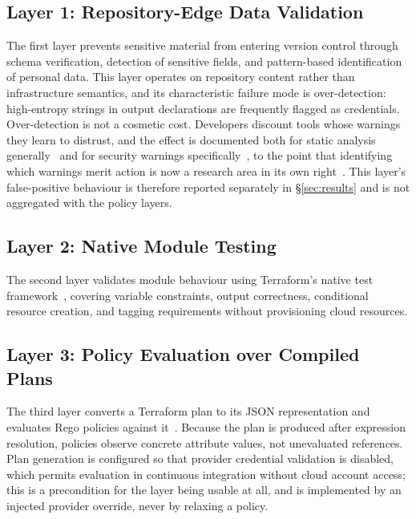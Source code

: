 \documentclass[journal]{IEEEtran}
\begin{document}
\subsection{Layer 1: Repository-Edge Data Validation}
The first layer prevents sensitive material from entering version control through
schema verification, detection of sensitive fields, and pattern-based
identification of personal data. This layer operates on repository content rather
than infrastructure semantics, and its characteristic failure mode is
over-detection: high-entropy strings in output declarations are frequently
flagged as credentials. Over-detection is not a cosmetic cost. Developers
discount tools whose warnings they learn to distrust, and the effect is
documented both for static analysis generally~\cite{vassallo2019engage} and for
security warnings specifically~\cite{tahaei2021notifications}, to the point that
identifying which warnings merit action is now a research area in its
own right~\cite{ge2023actionable}. This layer's false-positive behaviour is
therefore reported separately in \S\ref{sec:results} and is not aggregated with
the policy layers.

\subsection{Layer 2: Native Module Testing}
The second layer validates module behaviour using Terraform's native test
framework~\cite{hashicorp2024tests}, covering variable constraints, output
correctness, conditional resource creation, and tagging requirements without
provisioning cloud resources.

\subsection{Layer 3: Policy Evaluation over Compiled Plans}
The third layer converts a Terraform plan to its JSON representation and
evaluates Rego policies against it~\cite{openpolicyagent2024}. Because the plan
is produced after expression resolution, policies observe concrete attribute
values, not unevaluated references. Plan generation is configured so that
provider credential validation is disabled, which permits evaluation in
continuous integration without cloud account access; this is a precondition for
the layer being usable at all, and is implemented by an injected provider
override, never by relaxing a policy.
\end{document}
